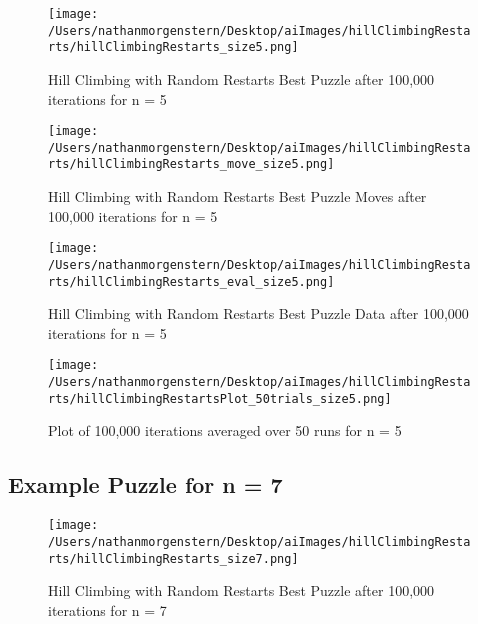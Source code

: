 \documentclass{report}
\begin{document}
	\begin{figure}[H]
	\centering
	\texttt{[image: /Users/nathanmorgenstern/Desktop/aiImages/hillClimbingRestarts/hillClimbingRestarts\_size5.png]}
	\caption{Hill Climbing with Random Restarts Best Puzzle after 100,000 iterations for n = 5} 
	\label{fig: Hill Climbing with Random Restarts Best Puzzle after 100,000 iterations for n = 5}
	\end{figure}
	
	\begin{figure}[H]
	\centering
	\texttt{[image: /Users/nathanmorgenstern/Desktop/aiImages/hillClimbingRestarts/hillClimbingRestarts\_move\_size5.png]}
	\caption{Hill Climbing with Random Restarts Best Puzzle Moves after 100,000 iterations for n = 5} 
	\label{fig: Hill Climbing with Random Restarts Best Puzzle Moves after 100,000 iterations for n = 5}
	\end{figure}

	\begin{figure}[H]
	\centering
	\texttt{[image: /Users/nathanmorgenstern/Desktop/aiImages/hillClimbingRestarts/hillClimbingRestarts\_eval\_size5.png]}
	\caption{Hill Climbing with Random Restarts Best Puzzle Data after 100,000 iterations for n = 5} 
	\label{fig: Hill Climbing with Random Restarts Best Puzzle Data after 100,000 iterations for n = 5}
	\end{figure}

	\begin{figure}[H]
	\centering
	\texttt{[image: /Users/nathanmorgenstern/Desktop/aiImages/hillClimbingRestarts/hillClimbingRestartsPlot\_50trials\_size5.png]}
	\caption{Plot of 100,000 iterations averaged over 50 runs for n = 5}
	\label{fig: Plot of 100,000 iterations averaged over 50 runs for n = 5}
	\end{figure}

\subsection{Example Puzzle for n = 7}

	\begin{figure}[H]
	\centering
	\texttt{[image: /Users/nathanmorgenstern/Desktop/aiImages/hillClimbingRestarts/hillClimbingRestarts\_size7.png]}
	\caption{Hill Climbing with Random Restarts Best Puzzle after 100,000 iterations for n = 7} 
	\label{fig: Hill Climbing with Random Restarts Best Puzzle after 100,000 iterations for n = 7}
	\end{figure}
	
\end{document}
